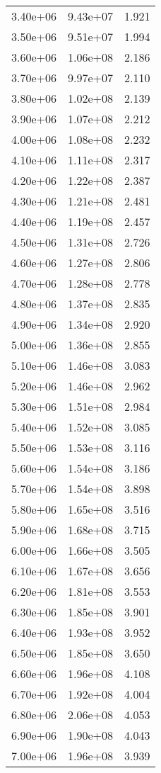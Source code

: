 \begin{table}
\begin{tabular}{lll}
3.40e+06 & 9.43e+07 & 1.921 \\
3.50e+06 & 9.51e+07 & 1.994 \\
3.60e+06 & 1.06e+08 & 2.186 \\
3.70e+06 & 9.97e+07 & 2.110 \\
3.80e+06 & 1.02e+08 & 2.139 \\
3.90e+06 & 1.07e+08 & 2.212 \\
4.00e+06 & 1.08e+08 & 2.232 \\
4.10e+06 & 1.11e+08 & 2.317 \\
4.20e+06 & 1.22e+08 & 2.387 \\
4.30e+06 & 1.21e+08 & 2.481 \\
4.40e+06 & 1.19e+08 & 2.457 \\
4.50e+06 & 1.31e+08 & 2.726 \\
4.60e+06 & 1.27e+08 & 2.806 \\
4.70e+06 & 1.28e+08 & 2.778 \\
4.80e+06 & 1.37e+08 & 2.835 \\
4.90e+06 & 1.34e+08 & 2.920 \\
5.00e+06 & 1.36e+08 & 2.855 \\
5.10e+06 & 1.46e+08 & 3.083 \\
5.20e+06 & 1.46e+08 & 2.962 \\
5.30e+06 & 1.51e+08 & 2.984 \\
5.40e+06 & 1.52e+08 & 3.085 \\
5.50e+06 & 1.53e+08 & 3.116 \\
5.60e+06 & 1.54e+08 & 3.186 \\
5.70e+06 & 1.54e+08 & 3.898 \\
5.80e+06 & 1.65e+08 & 3.516 \\
5.90e+06 & 1.68e+08 & 3.715 \\
6.00e+06 & 1.66e+08 & 3.505 \\
6.10e+06 & 1.67e+08 & 3.656 \\
6.20e+06 & 1.81e+08 & 3.553 \\
6.30e+06 & 1.85e+08 & 3.901 \\
6.40e+06 & 1.93e+08 & 3.952 \\
6.50e+06 & 1.85e+08 & 3.650 \\
6.60e+06 & 1.96e+08 & 4.108 \\
6.70e+06 & 1.92e+08 & 4.004 \\
6.80e+06 & 2.06e+08 & 4.053 \\
6.90e+06 & 1.90e+08 & 4.043 \\
7.00e+06 & 1.96e+08 & 3.939 \\

\end{tabular}
\end{table}
